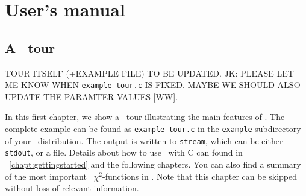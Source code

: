 
\part{User's manual}
\label{part:1}

\chapter{A \GLOBES\ tour}
\label{chapter:tour}

TOUR ITSELF (+EXAMPLE FILE) TO BE UPDATED. JK: PLEASE LET ME KNOW WHEN {\tt example-tour.c} IS FIXED. MAYBE WE SHOULD  ALSO UPDATE THE PARAMTER VALUES [WW].

In this first chapter, we show a \GLOBES\ tour illustrating the
main features of \GLOBES . The complete example  
can be found as {\tt example-tour.c} in the \verb+example+ subdirectory 
of your \GLOBES\ distribution.
The output is written to {\tt stream}, which can be either {\tt stdout},
or a file. Details about how to use \GLOBES\ with C can found in \Chapt~\ref{chapt:gettingstarted} and the following chapters.
You can also find a summary of the most important \GLOBES\ $\chi^2$-functions in . Note that this chapter
can be skipped without loss of relevant information.

